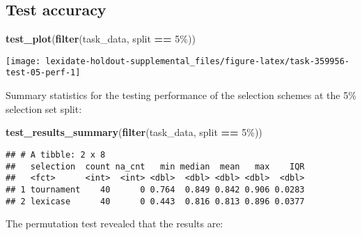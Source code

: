 \documentclass[
]{book}
\newenvironment{Shaded}{\begin{snugshade}}{\end{snugshade}}
\newcommand{\AttributeTok}[1]{\textcolor[rgb]{0.13,0.29,0.53}{#1}}
\newcommand{\DecValTok}[1]{\textcolor[rgb]{0.00,0.00,0.81}{#1}}
\newcommand{\FunctionTok}[1]{\textcolor[rgb]{0.13,0.29,0.53}{\textbf{#1}}}
\newcommand{\NormalTok}[1]{#1}
\newcommand{\OtherTok}[1]{\textcolor[rgb]{0.56,0.35,0.01}{#1}}
\newcommand{\SpecialCharTok}[1]{\textcolor[rgb]{0.81,0.36,0.00}{\textbf{#1}}}
\newcommand{\StringTok}[1]{\textcolor[rgb]{0.31,0.60,0.02}{#1}}
\begin{document}
\hypertarget{test-accuracy-25}{%
\subsection{Test accuracy}\label{test-accuracy-25}}

\begin{Shaded}
\begin{Highlighting}[]
\FunctionTok{test\_plot}\NormalTok{(}\FunctionTok{filter}\NormalTok{(task\_data, split }\SpecialCharTok{==} \StringTok{\textquotesingle{}5\%\textquotesingle{}}\NormalTok{))}
\end{Highlighting}
\end{Shaded}

\texttt{[image: lexidate-holdout-supplemental\_files/figure-latex/task-359956-test-05-perf-1]}

Summary statistics for the testing performance of the selection schemes at the 5\% selection set split:

\begin{Shaded}
\begin{Highlighting}[]
\FunctionTok{test\_results\_summary}\NormalTok{(}\FunctionTok{filter}\NormalTok{(task\_data, split }\SpecialCharTok{==} \StringTok{\textquotesingle{}5\%\textquotesingle{}}\NormalTok{))}
\end{Highlighting}
\end{Shaded}

\begin{verbatim}
## # A tibble: 2 x 8
##   selection  count na_cnt   min median  mean   max    IQR
##   <fct>      <int>  <int> <dbl>  <dbl> <dbl> <dbl>  <dbl>
## 1 tournament    40      0 0.764  0.849 0.842 0.906 0.0283
## 2 lexicase      40      0 0.443  0.816 0.813 0.896 0.0377
\end{verbatim}

The permutation test revealed that the results are:

\begin{Shaded}
\end{Shaded}
\end{document}
